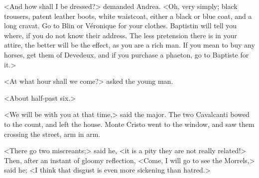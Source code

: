  <And how shall I be dressed?> demanded Andrea.  <Oh, very simply; black trousers, patent leather boots, white waistcoat, either a black or blue coat, and a long cravat. Go to Blin or Véronique for your clothes. Baptistin will tell you where, if you do not know their address. The less pretension there is in your attire, the better will be the effect, as you are a rich man. If you mean to buy any horses, get them of Devedeux, and if you purchase a phaeton, go to Baptiste for it.> 

 <At what hour shall we come?> asked the young man. 

 <About half-past six.> 

 <We will be with you at that time,> said the major. The two Cavalcanti bowed to the count, and left the house. Monte Cristo went to the window, and saw them crossing the street, arm in arm. 

 <There go two miscreants;> said he, <it is a pity they are not really related!> Then, after an instant of gloomy reflection, <Come, I will go to see the Morrels,> said he; <I think that disgust is even more sickening than hatred.>  